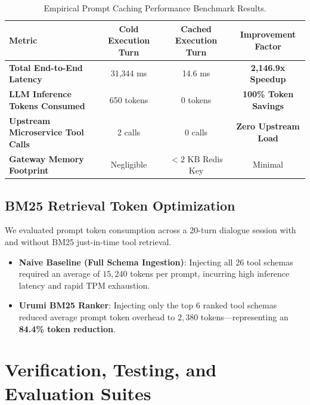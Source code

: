 \documentclass[11pt,a4paper]{article}
\begin{document}
\begin{table}[h!]
\centering
\small
\begin{tabularx}{\textwidth}{X c c c}
\toprule
\textbf{Metric} & \textbf{Cold Execution Turn} & \textbf{Cached Execution Turn} & \textbf{Improvement Factor} \\
\midrule
\textbf{Total End-to-End Latency} & 31,344 ms & 14.6 ms & \textbf{2,146.9x Speedup} \\
\textbf{LLM Inference Tokens Consumed} & 650 tokens & 0 tokens & \textbf{100\% Token Savings} \\
\textbf{Upstream Microservice Tool Calls} & 2 calls & 0 calls & \textbf{Zero Upstream Load} \\
\textbf{Gateway Memory Footprint} & Negligible & $<2 \text{ KB}$ Redis Key & Minimal \\
\bottomrule
\end{tabularx}
\caption{Empirical Prompt Caching Performance Benchmark Results.}
\label{tab:benchmarks}
\end{table}

\subsection{BM25 Retrieval Token Optimization}
We evaluated prompt token consumption across a 20-turn dialogue session with and without BM25 just-in-time tool retrieval. 
\begin{itemize}[leftmargin=*]
    \item \textbf{Naive Baseline (Full Schema Ingestion)}: Injecting all 26 tool schemas required an average of $15,240$ tokens per prompt, incurring high inference latency and rapid TPM exhaustion.
    \item \textbf{Urumi BM25 Ranker}: Injecting only the top 6 ranked tool schemas reduced average prompt token overhead to $2,380$ tokens---representing an \textbf{84.4\% token reduction}.
\end{itemize}

\section{Verification, Testing, and Evaluation Suites}
\end{document}
